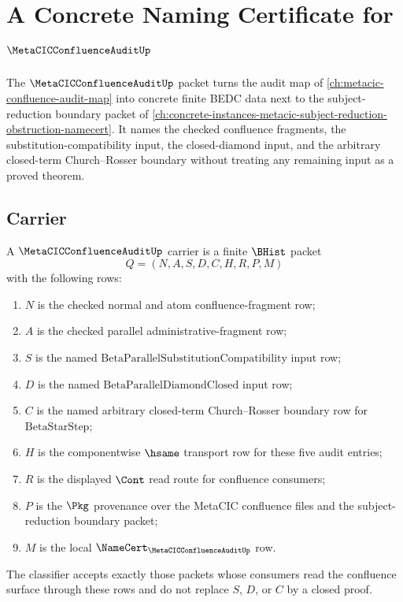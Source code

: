 \chapter{A Concrete Naming Certificate for $\MetaCICConfluenceAuditUp$}
\label{ch:concrete-instances-metacic-confluence-audit-namecert}

The $\MetaCICConfluenceAuditUp$ packet turns the audit map of \autoref{ch:metacic-confluence-audit-map} into concrete finite BEDC data next to the subject-reduction boundary packet of \autoref{ch:concrete-instances-metacic-subject-reduction-obstruction-namecert}. It names the checked confluence fragments, the substitution-compatibility input, the closed-diamond input, and the arbitrary closed-term Church--Rosser boundary without treating any remaining input as a proved theorem.

\section{Carrier}
\label{sec:metacic-confluence-audit-carrier}

\begin{definition}
\label{def:metacic-confluence-audit-carrier}
A $\MetaCICConfluenceAuditUp$ carrier is a finite $\BHist$ packet
$$
Q=(N,A,S,D,C,H,R,P,M)
$$
with the following rows:
\begin{enumerate}
  \item $N$ is the checked normal and atom confluence-fragment row;
  \item $A$ is the checked parallel administrative-fragment row;
  \item $S$ is the named $\mathrm{BetaParallelSubstitutionCompatibility}$ input row;
  \item $D$ is the named $\mathrm{BetaParallelDiamondClosed}$ input row;
  \item $C$ is the named arbitrary closed-term Church--Rosser boundary row for $\mathrm{BetaStarStep}$;
  \item $H$ is the componentwise $\hsame$ transport row for these five audit entries;
  \item $R$ is the displayed $\Cont$ read route for confluence consumers;
  \item $P$ is the $\Pkg$ provenance over the MetaCIC confluence files and the subject-reduction boundary packet;
  \item $M$ is the local $\NameCert_{\MetaCICConfluenceAuditUp}$ row.
\end{enumerate}
The classifier accepts exactly those packets whose consumers read the confluence surface through these rows and do not replace $S$, $D$, or $C$ by a closed proof.
\end{definition}

